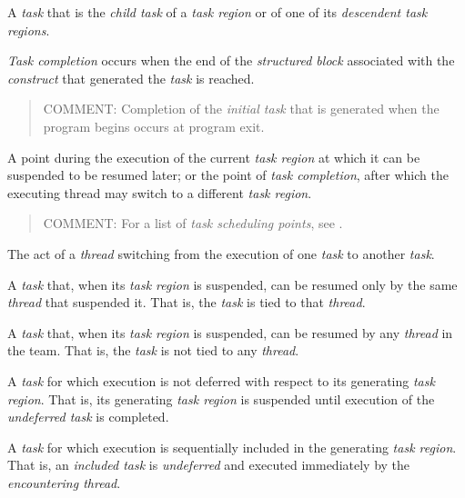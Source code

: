 \glossarydefstart
A \emph{task} that is the \emph{child task} of a \emph{task region} or of one of its
\emph{descendent task regions}.
\glossarydefend

\glossarydefstart
\emph{Task completion} occurs when the end of the \emph{structured block} associated with the
\emph{construct} that generated the \emph{task} is reached.

\begin{quote}
COMMENT: Completion of the \emph{initial task} that is generated when the program begins occurs at program exit.
\end{quote}
\glossarydefend

\glossarydefstart
A point during the execution of the current \emph{task region} at which it can be
suspended to be resumed later; or the point of \emph{task completion}, after which the
executing thread may switch to a different \emph{task region}.

\begin{quote}
COMMENT: For a list of \emph{task scheduling points}, see .
\end{quote}
\glossarydefend

\glossarydefstart
The act of a \emph{thread} switching from the execution of one \emph{task} to another \emph{task}.
\glossarydefend

\glossarydefstart
A \emph{task} that, when its \emph{task region} is suspended, can be resumed only by the same
\emph{thread} that suspended it. That is, the \emph{task} is tied to that \emph{thread}.
\glossarydefend

\glossarydefstart
A \emph{task} that, when its \emph{task region} is suspended, can be resumed by any \emph{thread} in
the team. That is, the \emph{task} is not tied to any \emph{thread}.
\glossarydefend

\glossarydefstart
A \emph{task} for which execution is not deferred with respect to its generating \emph{task}
\emph{region}. That is, its generating \emph{task region} is suspended until execution of the
\emph{undeferred task} is completed.
\glossarydefend

\glossarydefstart
A \emph{task} for which execution is sequentially included in the generating \emph{task region}.
That is, an \emph{included task} is \emph{undeferred} and executed immediately by the
\emph{encountering thread}.
\glossarydefend

